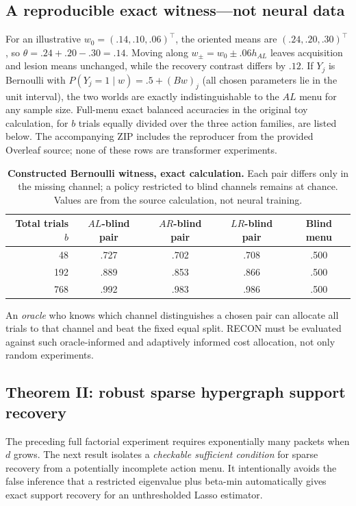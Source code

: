 \documentclass[11pt,a4paper]{article}
\theoremstyle{definition}\newtheorem{definition}[theorem]{Definition}
\theoremstyle{remark}\newtheorem{remark}[theorem]{Remark}
\begin{document}
\subsection{A reproducible exact witness---not neural data}
For an illustrative $w_0=(.14,.10,.06)^\top$, the oriented means are $(.24,.20,.30)^\top$, so $\theta=.24+.20-.30=.14$. Moving along $w_\pm=w_0\pm .06h_{AL}$ leaves acquisition and lesion means unchanged, while the recovery contrast differs by $.12$. If $Y_j$ is Bernoulli with $P(Y_j=1\mid w)=.5+(Bw)_j$ (all chosen parameters lie in the unit interval), the two worlds are exactly indistinguishable to the $AL$ menu for any sample size. Full-menu exact balanced accuracies in the original toy calculation, for $b$ trials equally divided over the three action families, are listed below. The accompanying ZIP includes the reproducer from the provided Overleaf source; none of these rows are transformer experiments.
\begin{table}[htbp]\centering\small
\caption{\textbf{Constructed Bernoulli witness, exact calculation.} Each pair differs only in the missing channel; a policy restricted to blind channels remains at chance. Values are from the source calculation, not neural training.}\label{tab:witness}
\begin{tabular}{rcccc}\toprule
Total trials $b$&$AL$-blind pair&$AR$-blind pair&$LR$-blind pair&Blind menu\\\midrule
48&.727&.702&.708&.500\\
192&.889&.853&.866&.500\\
768&.992&.983&.986&.500\\\bottomrule
\end{tabular}
\end{table}
An \emph{oracle} who knows which channel distinguishes a chosen pair can allocate all trials to that channel and beat the fixed equal split. RECON must be evaluated against such oracle-informed and adaptively informed cost allocation, not only random experiments.

\subsection{Theorem II: robust sparse hypergraph support recovery}\label{sec:robust}
The preceding full factorial experiment requires exponentially many packets when $d$ grows. The next result isolates a \emph{checkable sufficient condition} for sparse recovery from a potentially incomplete action menu. It intentionally avoids the false inference that a restricted eigenvalue plus beta-min automatically gives exact support recovery for an unthresholded Lasso estimator.
\end{document}
